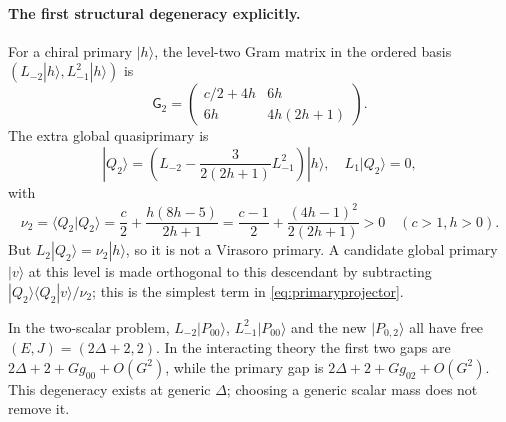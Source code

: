 \documentclass[11pt,a4paper]{article}
\numberwithin{equation}{section}
\theoremstyle{remark}\newtheorem{remark}[theorem]{Remark}
\begin{document}
\paragraph{The first structural degeneracy explicitly.}
For a chiral primary $|h\rangle$, the level-two Gram matrix in the ordered basis
$(L_{-2}|h\rangle,L_{-1}^2|h\rangle)$ is
\begin{equation}
 \mathsf G_2=
 \begin{pmatrix}
 c/2+4h&6h\\ 6h&4h(2h+1)
 \end{pmatrix}.
 \label{eq:Gram2}
\end{equation}
The extra global quasiprimary is
\begin{equation}
 |Q_2\rangle=\left(L_{-2}-\frac3{2(2h+1)}L_{-1}^2\right)|h\rangle,
 \quad L_1|Q_2\rangle=0,
\end{equation}
with
\begin{equation}
 \nu_2=\langle Q_2|Q_2\rangle
 =\frac c2+\frac{h(8h-5)}{2h+1}
 =\frac{c-1}{2}+\frac{(4h-1)^2}{2(2h+1)}>0
 \quad(c>1,h>0).
 \label{eq:nu2}
\end{equation}
But $L_2|Q_2\rangle=\nu_2|h\rangle$, so it is not a Virasoro primary. A candidate global primary $|v\rangle$ at this level is made orthogonal to this descendant by subtracting
$|Q_2\rangle\langle Q_2|v\rangle/\nu_2$; this is the simplest term in \eqref{eq:primaryprojector}.

In the two-scalar problem, $L_{-2}|P_{00}\rangle$, $L_{-1}^2|P_{00}\rangle$ and the new $|P_{0,2}\rangle$ all have free $(E,J)=(2\Delta+2,2)$. In the interacting theory the first two gaps are
$2\Delta+2+Gg_{00}+O(G^2)$, while the primary gap is
$2\Delta+2+Gg_{02}+O(G^2)$. This degeneracy exists at generic $\Delta$; choosing a generic scalar mass does not remove it.
\end{document}
